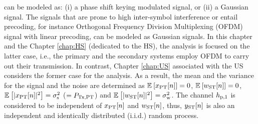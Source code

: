  can be modeled as: (i) a phase shift keying modulated signal, or (ii) a Gaussian signal. The signals that are prone to high inter-symbol interference or entail precoding, for instance Orthogonal Frequency Division Multiplexing (OFDM) signal with linear precoding, can be modeled as Gaussian signals. In this chapter and the Chapter \ref{chap:HS} (dedicated to the HS), the analysis is focused on the latter case, i.e., the primary and the secondary systems employ OFDM to carry out their transmission. In contrast, Chapter \ref{chap:US} associated with the US considers the former case for the analysis. As a result, the mean and the variance for the signal and the noise are determined as ${\mathbb E}_{}\left[ x_{\text{PT}}[n] \right] = 0$, ${\mathbb E}_{}\left[ w_{\text{ST}}[n] \right] = 0$, ${\mathbb E}_{}\left[ |x_{\text{PT}}[n]|^2 \right] = \sigma^2_{\text{s}}$ ($= P_{\text{Tx,PT}}$) and ${\mathbb E}_{}\left[ |w_{\text{ST}}[n]|^2 \right] = \sigma^2_{\text{w}}$. The channel $h_{\text{p,1}}$ is considered to be independent of $x_{\text{PT}}[n]$ and $w_{\text{ST}}[n]$, thus, $y_{\text{ST}}[n]$ is also an independent and identically distributed (i.i.d.) random process. %


